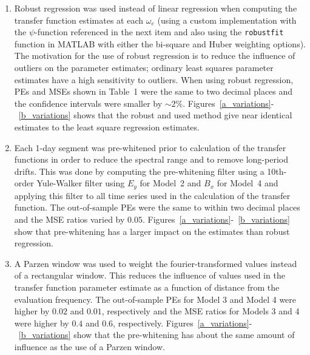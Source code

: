 \documentclass[draft,linenumbers]{agujournal2018}
\begin{document}
\begin{enumerate}

\item Robust regression was used instead of linear regression when computing the transfer function estimates at each $\omega_e$ (using a custom implementation with the $\psi$-function referenced in the next item and also using the \texttt{robustfit} function in MATLAB with either the bi-square and Huber weighting options). The motivation for the use of robust regression is to reduce the influence of outliers on the parameter estimates; ordinary least squares parameter estimates have a high sensitivity to outliers. When using robust regression, PEs and MSEs shown in Table~1 were the same to two decimal places and the confidence intervals were smaller by $\sim 2$\%. Figures~\ref{a_variations}-~\ref{b_variations} shows that the robust and used method give near identical estimates to the least square regression estimates.

\item Each 1-day segment was pre-whitened prior to calculation of the transfer functions in order to reduce the spectral range and to remove long-period drifts. This was done by computing the pre-whitening filter using a 10th-order Yule-Walker filter using $E_y$ for Model~2 and $B_x$ for Model~4 and applying this filter to all time series used in the calculation of the transfer function. The out-of-sample PEs were the same to within two decimal places and the MSE ratios varied by $0.05$.  Figures~\ref{a_variations}-~\ref{b_variations} show that pre-whitening has a larger impact on the estimates than robust regression.

\item A Parzen window was used to weight the fourier-transformed values instead of a rectangular window. This reduces the influence of values used in the transfer function parameter estimate as a function of distance from the evaluation frequency. The out-of-sample PEs for Model 3 and Model 4 were higher by $0.02$ and $0.01$, respectively and the MSE ratios for Models 3 and 4 were higher by $0.4$ and $0.6$, respectively. Figures~\ref{a_variations}-~\ref{b_variations} show that the pre-whitening has about the same amount of influence as the use of a Parzen window.


\end{enumerate}
\end{document}
